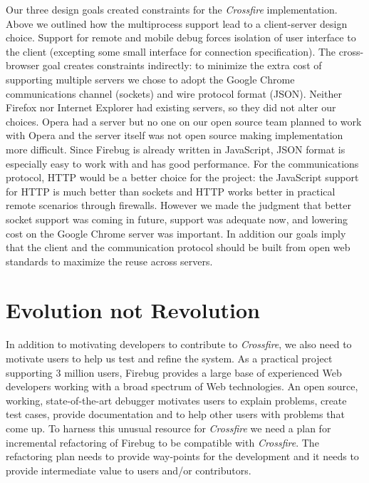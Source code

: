 Our three design goals created constraints for the \textit{Crossfire} implementation.
Above we outlined
how the multiprocess support lead to a client-server design choice. Support for
remote and mobile debug forces isolation of user interface to the client
(excepting some small interface for connection specification). The cross-browser
goal creates constraints indirectly: to minimize the extra cost of supporting
multiple servers we chose to adopt the Google Chrome communications channel
(sockets) and wire protocol format (JSON). Neither Firefox nor Internet Explorer
had existing servers, so they did not alter our choices. Opera had a server but
no one on our open source team planned to work with Opera and the server itself
was not open source making implementation more difficult.  Since Firebug is
already written in JavaScript, JSON format is especially easy to work with and
has good performance\cite{json}.  For the communications protocol, HTTP would be
a better choice for the project: the JavaScript support for HTTP is much better
than sockets and HTTP works better in practical remote scenarios through
firewalls.  However we made the judgment that better socket support was coming
in future\cite{websocketapi}, support was adequate now, and lowering cost on
the Google Chrome server was important.  In addition our goals imply that the
client and the communication protocol should be built from open web standards to
maximize the reuse across servers.

\section{Evolution not Revolution}
In addition to motivating developers to contribute to \textit{Crossfire}, we also need to motivate users
to help us test and refine the system.
As a practical project supporting 3 million users, Firebug
provides a large base of experienced Web developers working with a broad spectrum of Web technologies.
An open source, working, state-of-the-art debugger motivates users to explain problems, create test cases,
provide documentation and to help other users with problems that come up. To harness this
 unusual resource  for \textit{Crossfire} we need a plan for incremental refactoring of Firebug to be compatible
with \textit{Crossfire}.  The refactoring plan needs to provide way-points for the development and it needs to
provide intermediate value to users and/or contributors.

